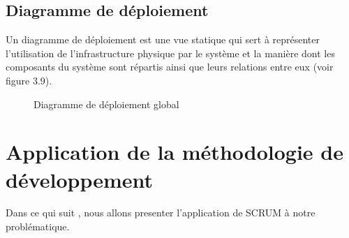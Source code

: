\subsection{\Large Diagramme de déploiement}
\textsf{\selectfont{} Un diagramme de déploiement est une vue statique qui sert à représenter l'utilisation de l'infrastructure physique par le système et la manière dont les composants du système sont répartis ainsi que leurs relations entre eux (voir figure 3.9).\cite{15}}
\begin{figure}[H]
  \begin{center}
  

  \end{center}
  
  \caption{Diagramme de déploiement global}
\end{figure}
\section{\LARGE Application de la méthodologie de développement}
\textsf{\selectfont{}Dans ce qui suit , nous allons presenter l'application de SCRUM à notre problématique.}

